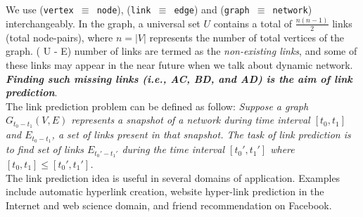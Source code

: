 We use (\texttt{vertex $\equiv$ node}), (\texttt{link $\equiv$ edge}) and
(\texttt{graph $\equiv$ network}) interchangeably. In the graph, a universal set
\(U\) contains a total of \(\frac{n(n-1)}{2}\) links (total node-pairs), where
\(n = |V|\) represents the number of total vertices of the graph. (\textbar
U\textbar{} - \textbar E\textbar) number of links are termed as the
\emph{non-existing links}, and some of these links may appear in the near future
when we talk about dynamic network. \textbf{\emph{Finding such missing links
        (i.e., AC, BD, and AD) is the aim of link prediction}}.\\

The link prediction problem can be defined as follow: \emph{Suppose a graph
    $G_{t_0 - t_1} (V, E)$ represents a snapshot of a network
    during time interval $[t_0 ,t_1]$ and $E_{t_0 -
                t_1}$, a set of links present in that snapshot. The task of link
    prediction is to find set of links $E_{t_0' - t_1'}$ during
    the time interval $[t_0' ,t_1']$ where $[t_0 ,t_1]
        \leq [t_0' ,t_1']$.}\\

The link prediction idea is useful in several domains of application. Examples
include automatic hyperlink creation, website hyper-link prediction in the
Internet and web science domain, and friend recommendation on Facebook.